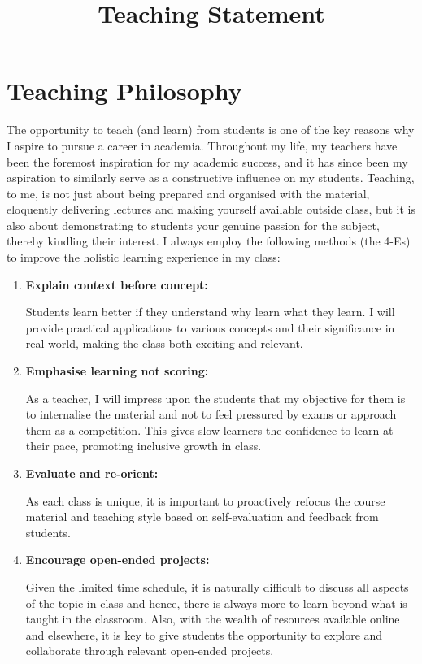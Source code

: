 \documentclass[12pt,a4paper,sans]{moderncv} %
\title{Teaching Statement}
\begin{document}
\makecvtitle %


\section{Teaching Philosophy}
The opportunity to teach (and learn) from students is one of the key reasons why I aspire to pursue a career in academia. Throughout my life, my teachers have been the foremost inspiration for my academic success, and it has since been my aspiration to similarly serve as a constructive influence on my students. Teaching, to me, is not just about being prepared and organised with the material, eloquently delivering lectures and making yourself available outside class, but it is also about demonstrating to students your genuine passion for the subject, thereby kindling their interest. I always employ the following methods (the 4-Es) to improve the holistic learning experience in my class:
\begin{enumerate}

\item \textbf{Explain context before concept:} \par Students learn better if they understand why learn what they learn. I will provide practical applications to various concepts and their significance in real world, making the class both exciting and relevant.
\item \textbf{Emphasise learning not scoring:}\par As a teacher, I will impress upon the students that my objective for them is to internalise the material and not to feel pressured by exams or approach them as a competition. This gives slow-learners the confidence to learn at their pace, promoting inclusive growth in class.
\item \textbf{Evaluate and re-orient:} \par As each class is unique, it is important to proactively refocus the course material and teaching style based on self-evaluation and feedback from students. 
\item \textbf{Encourage open-ended projects:} \par Given the limited time schedule,
it is naturally difficult to discuss all aspects of the topic in class and hence, there is always more to learn
beyond what is taught in the classroom. Also, with the wealth of resources available online and elsewhere,
it is key to give students the opportunity to explore and collaborate through relevant open-ended projects.
\end{enumerate}
\end{document}
